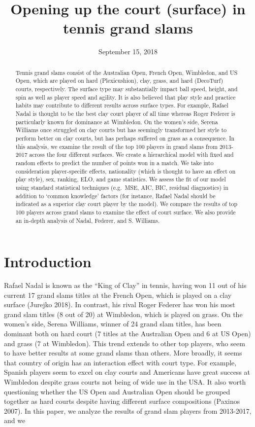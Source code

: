 \documentclass[]{article}
\title{Opening up the court (surface) in tennis grand slams}
\author{}
\date{September 15, 2018}
\begin{document}
\maketitle
\begin{abstract}
Tennis grand slams consist of the Australian Open, French Open,
Wimbledon, and US Open, which are played on hard (Plexicushion), clay,
grass, and hard (DecoTurf) courts, respectively. The surface type may
substantially impact ball speed, height, and spin as well as player
speed and agility. It is also believed that play style and practice
habits may contribute to different results across surface types. For
example, Rafael Nadal is thought to be the best clay court player of all
time whereas Roger Federer is particularly known for dominance at
Wimbledon. On the women's side, Serena Williams once struggled on clay
courts but has seemingly transformed her style to perform better on clay
courts, but has perhaps suffered on grass as a consequence. In this
analysis, we examine the result of the top 100 players in grand slams
from 2013-2017 across the four different surfaces. We create a
hierarchical model with fixed and random effects to predict the number
of points won in a match. We take into consideration player-specific
effects, nationality (which is thought to have an effect on play style),
sex, ranking, ELO, and game statistics. We assess the fit of our model
using standard statistical techniques (e.g.~MSE, AIC, BIC, residual
diagnostics) in addition to `common knowledge' factors (for instance,
Rafael Nadal should be indicated as a superior clay court player by the
model). We compare the results of top 100 players across grand slams to
examine the effect of court surface. We also provide an in-depth
analysis of Nadal, Federer, and S. Williams.
\end{abstract}

{
\setcounter{tocdepth}{2}
\tableofcontents
}
\hypertarget{sec:iintro}{%
\section{Introduction}\label{sec:iintro}}

Rafael Nadal is known as the ``King of Clay'' in tennis, having won 11
out of his current 17 grand slams titles at the French Open, which is
played on a clay surface (Jurejko 2018). In contrast, his rival Roger
Federer has won his most grand slam titles (8 out of 20) at Wimbledon,
which is played on grass. On the women's side, Serena Williams, winner
of 24 grand slam titles, has been dominant both on hard court (7 titles
at the Australian Open and 6 at US Open) and grass (7 at Wimbledon).
This trend extends to other top players, who seem to have better results
at some grand slams than others. More broadly, it seems that country of
origin has an interaction effect with court type. For example, Spanish
players seem to excel on clay courts and Americans have great success at
Wimbledon despite grass courts not being of wide use in the USA. It also
worth questioning whether the US Open and Australian Open should be
grouped together as hard courts despite having different surface
compositions (Paxinos 2007). In this paper, we analyze the results of
grand slam players from 2013-2017, and we
\end{document}
